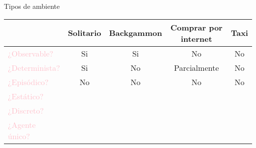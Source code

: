 
    \begin{frame}{Tipos de ambiente}
        \begin{center}
        \begin{tabular}{|l|c|c|c|c|} \hline
                \multicolumn{1}{|p{2cm}|}{\centering }
              & \multicolumn{1}{p{1.3cm}|}{\centering Solitario}
              & \multicolumn{1}{p{2.1cm}|}{\centering Backgammon}
              & \multicolumn{1}{p{3.4cm}|}{\centering Comprar por internet}
              & \multicolumn{1}{p{0.7cm}|}{\centering Taxi}
                \tabularnewline \hline
                \textcolor{Pink}{¿Observable?} & Si & Si & No & No \\
                \textcolor{Pink}{¿Determinista?} & Si & No & Parcialmente & No \\
                \textcolor{Pink}{¿Episódico?} & No & No & No & No \\
                \textcolor{Pink}{¿Estático?} & & & & \\
                \textcolor{Pink}{¿Discreto?} &  &  & &  \\
                \textcolor{Pink}{¿Agente único?} &  &  &  &  \\ \hline
        \end{tabular}
        \end{center}
    \end{frame}

